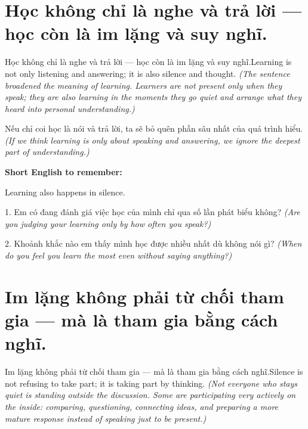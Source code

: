 \section{Học không chỉ là nghe và trả lời — học còn là im lặng và suy nghĩ.}
\begin{truyen}{Học không chỉ là nghe và trả lời — học còn là im lặng và suy nghĩ.}{Learning is not only listening and answering; it is also silence and thought.}
\textit{(The sentence broadened the meaning of learning. Learners are not present only when they speak; they are also learning in the moments they go quiet and arrange what they heard into personal understanding.)}
\end{truyen}

\begin{baihoc}
Nếu chỉ coi học là nói và trả lời, ta sẽ bỏ quên phần sâu nhất của quá trình hiểu.
\textit{(If we think learning is only about speaking and answering, we ignore the deepest part of understanding.)}
\end{baihoc}

\begin{ghinhoanh}
\textbf{Short English to remember:}

Learning also happens in silence.

\end{ghinhoanh}

\begin{tuhocnhanh}
1. Em có đang đánh giá việc học của mình chỉ qua số lần phát biểu không? \textit{(Are you judging your learning only by how often you speak?)}

2. Khoảnh khắc nào em thấy mình học được nhiều nhất dù không nói gì? \textit{(When do you feel you learn the most even without saying anything?)}
\end{tuhocnhanh}
\ngancach


\section{Im lặng không phải từ chối tham gia — mà là tham gia bằng cách nghĩ.}
\begin{truyen}{Im lặng không phải từ chối tham gia — mà là tham gia bằng cách nghĩ.}{Silence is not refusing to take part; it is taking part by thinking.}
\textit{(Not everyone who stays quiet is standing outside the discussion. Some are participating very actively on the inside: comparing, questioning, connecting ideas, and preparing a more mature response instead of speaking just to be present.)}
\end{truyen}

